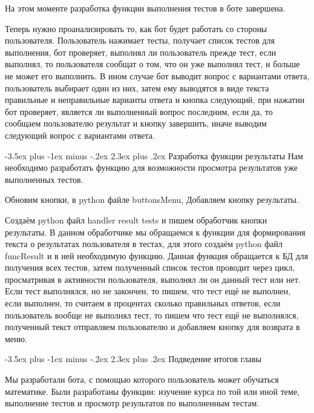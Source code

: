 \documentclass[12pt, oldlfont, amsfonts]{report}
\makeatletter
\renewcommand{\section}{\@startsection{section}{1}{0pt}%
                                {-3.5ex plus -1ex minus -.2ex}%
                                {2.3ex plus .2ex}%
{\centering\hyphenpenalty=10000\normalfont\Large\bfseries}}
\makeatother
\begin{document}
На этом моменте разработка функции выполнения тестов в боте завершена. 

Теперь нужно проанализировать то, как бот будет работать со стороны пользователя. Пользователь нажимает тесты, получает список тестов для выполнения, бот проверяет, выполнял ли пользователь прежде тест, если выполнял, то пользователя сообщат о том, что он уже выполнял тест, и больше не может его выполнить. В ином случае бот выводит вопрос с вариантами ответа, пользователь выбирает один из них, затем ему выводятся в виде текста правильные и неправильные варианты ответа и кнопка следующий, при нажатии бот проверяет, является ли выполненный вопрос последним, если да, то сообщаем пользователю результат и кнопку { завершить}, иначе выводим следующий вопрос с вариантами ответа.



\section{Разработка функции результаты}
Нам необходимо разработать функцию для возможности просмотра результатов уже выполненных тестов.

Обновим кнопки, в python файле { buttonsMenu}, Добавляем кнопку { результаты}.

Создаём python файл { handler result tests} и пишем обработчик кнопки { результаты}. В данном обработчике мы обращаемся к функции для формирования текста о результатах пользователя в тестах, для этого создаём python файл { funcResult} и в ней необходимую функцию. Данная функция обращается к БД для получения всех тестов, затем полученный список тестов проводит через цикл, просматривая в активности пользователя, выполнял ли он данный тест или нет. Если тест выполнялся, но не закончен, то пишем, что тест ещё не выполнен, если выполнен, то считаем в процентах сколько правильных ответов, если пользователь вообще не выполнял тест, то пишем что тест ещё не выполнялся, полученный текст отправляем пользователю и добавляем кнопку для возврата в меню.



\section{Подведение итогов главы}

Мы разработали бота, с помощью которого пользователь может обучаться математике. Были разработаны функции: изучение курса по той или иной теме, выполнение тестов и просмотр результатов по выполненным тестам.
\end{document}
